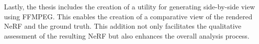 Lastly, the thesis includes the creation of a utility for generating side-by-side view using FFMPEG. This enables the creation of a comparative view of the rendered NeRF and the ground truth. This addition not only facilitates the qualitative assessment of the resulting NeRF but also enhances the overall analysis process.

\begin{comment}
\begin{itemize}
    \item Pipeline from CARLA to Nerfstudio
    \begin{itemize}
        \item Enables experimenting with data capture techniques that can later be applied to real world scenarios.
        \item Enables running multiple experiments with different experiment settings, e.g. camera setup, vehicle speed, route, image resolution, etc., in a streamlined way.
        \item The data output from the experiment-pipeline in CARLA is in a format supported by most NeRFs. Enables training NeRFs on the synthetic data captured in CARLA, and, based on the evaluation of the NeRF, tweak settings to improve the resulting image synthesis.
    \end{itemize}
    \item A baseline for NeRFs trained on synthetic data captured in CARLA. 
    \begin{itemize}
        \item Can be used to further improve both the data capture and the NeRF-models on synthetic data.
        \item Can be used to experiment with data capture- and NeRF-settings.
        \item The metrics used to evaluate the baseline (PSNR, SSIM and LPIPS) are widely used throughout NeRF-research and makes comparable.
    \end{itemize}
    \item Block NeRF in Nerfstudio API
    \begin{itemize}
        \item Creates a naive Block NeRF implementation with the Nerfstudio API, demonstrating how such an approach can substantially increase the quality of large scene NeRFs.
        \item The PoC allows testing which parameters are important when capturing large-scale data for NeRFs. E.g. the segment size, overlap between the blocks, and image merging techniques.
    \end{itemize}
    \item Side-by-side view
    \begin{itemize}
        \item Leverage FFMPEG to create a script for generating side-by-side views of the rendered NeRF and the ground truth.
        \item Makes qualitative assessment of the resulting NeRF easier.
    \end{itemize}
\end{itemize}

\end{comment}




